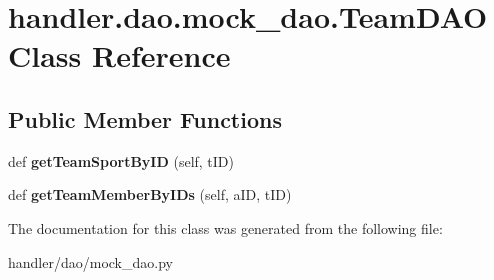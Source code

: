 \hypertarget{classhandler_1_1dao_1_1mock__dao_1_1_team_d_a_o}{}\section{handler.\+dao.\+mock\+\_\+dao.\+Team\+D\+AO Class Reference}
\label{classhandler_1_1dao_1_1mock__dao_1_1_team_d_a_o}
\subsection*{Public Member Functions}
\begin{DoxyCompactItemize}
\item 
\mbox{\label{classhandler_1_1dao_1_1mock__dao_1_1_team_d_a_o_a697bc0b05636a5d53baa9d6b157ecd91}} 
def {\bfseries get\+Team\+Sport\+By\+ID} (self, t\+ID)
\item 
\mbox{\label{classhandler_1_1dao_1_1mock__dao_1_1_team_d_a_o_a543062fe5cc33376c5ee278f29e37b44}} 
def {\bfseries get\+Team\+Member\+By\+I\+Ds} (self, a\+ID, t\+ID)
\end{DoxyCompactItemize}


The documentation for this class was generated from the following file\+:\begin{DoxyCompactItemize}
\item 
handler/dao/mock\+\_\+dao.\+py\end{DoxyCompactItemize}
